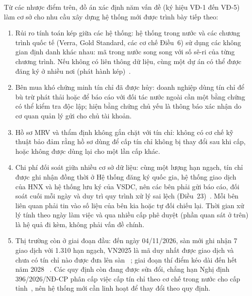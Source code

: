 Từ các nhược điểm trên, đồ án xác định năm vấn đề (ký hiệu VĐ-1 đến VĐ-5) làm cơ sở cho nhu cầu xây dựng hệ thống mới được trình bày tiếp theo:
\begin{enumerate}[label=VĐ-\arabic*., leftmargin=1.6cm]
    \item Rủi ro tính toán kép giữa các hệ thống: hệ thống trong nước và các chương trình quốc tế (Verra, Gold Standard, các cơ chế Điều~6) sử dụng các không gian định danh khác nhau: mã trong nước song song với số sê-ri của từng chương trình. Nếu không có liên thông dữ liệu, cùng một dự án có thể được đăng ký ở nhiều nơi (phát hành kép)~\cite{schneider2019double}.
    \item Bên mua khó chứng minh tín chỉ đã được hủy: doanh nghiệp dùng tín chỉ để bù trừ phát thải hoặc để báo cáo với đối tác nước ngoài cần một bằng chứng có thể kiểm tra độc lập; hiện bằng chứng chủ yếu là thông báo xác nhận do cơ quan quản lý gửi cho chủ tài khoản.
    \item Hồ sơ MRV và thẩm định không gắn chặt với tín chỉ: không có cơ chế kỹ thuật bảo đảm rằng hồ sơ dùng để cấp tín chỉ không bị thay đổi sau khi cấp, hoặc không được dùng lại cho một lần cấp khác.
    \item Chi phí đối soát giữa nhiều cơ sở dữ liệu: cùng một lượng hạn ngạch, tín chỉ được ghi nhận đồng thời ở Hệ thống đăng ký quốc gia, hệ thống giao dịch của HNX và hệ thống lưu ký của VSDC, nên các bên phải gửi báo cáo, đối soát cuối mỗi ngày và duy trì quy trình xử lý sai lệch (Điều~23)~\cite{vietnam2026thongtu11}. Mỗi bên liên quan phải tin vào số liệu của bên kia hoặc tự đối chiếu lại. Thời gian xử lý tính theo ngày làm việc và qua nhiều cấp phê duyệt (phần quan sát ở trên) là hệ quả đi kèm, không phải vấn đề chính.
    \item Thị trường còn ở giai đoạn đầu: đến ngày 04/11/2026, sàn mới ghi nhận 7 giao dịch với 1.310 hạn ngạch, VN2025 là mã duy nhất được giao dịch và chưa có tín chỉ nào được đưa lên sàn~\cite{dantri2026san3thang} \cite{hnx2026sanphamcacbon}; giai đoạn thí điểm kéo dài đến hết năm 2028~\cite{vietnam2025qd232} \cite{dbnd2026santhuong}. Các quy định còn đang được sửa đổi, chẳng hạn Nghị định 396/2026/NĐ-CP phân cấp việc cấp tín chỉ theo cơ chế trong nước cho cấp tỉnh~\cite{vietnam2026nghidinh396}, nên hệ thống mới cần linh hoạt để thay đổi theo quy định.
\end{enumerate}

